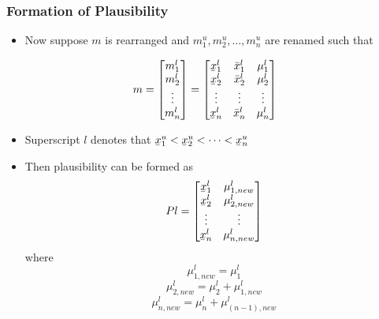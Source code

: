 \documentclass{beamer}
\newcommand{\ubar}[1]{\underaccent{\bar}{#1}}
\begin{document}
\begin{frame}[allowframebreaks]
\frametitle{Formation of Plausibility}
\begin{itemize}
\item{Now suppose $m$ is rearranged and $m_{1}^{u}, m_{2}^{u},\dots, m_{n}^{u}$ are renamed such that}
\end{itemize}
\begin{equation}
m = \begin{bmatrix*}
m_1^l \\
m_2^l \\
\vdots \\
m_n^l \end{bmatrix*}
= \begin{bmatrix*}
\ubar{x}_1^l & \bar{x}_1^l & \mu_1^l \\
\ubar{x}_2^l & \bar{x}_2^l & \mu_2^l \\
\vdots & \vdots & \vdots \\
\ubar{x}_n^l & \bar{x}_n^l & \mu_n^l \\ \end{bmatrix*}
\label{mu}
\end{equation}
\begin{itemize}
\item{Superscript $l$ denotes that $\ubar{x}_1^u < \ubar{x}_2^u < \dots < \ubar{x}_n^u$}
\framebreak
\item{Then plausibility can be formed as
\begin{equation}
Pl = \begin{bmatrix*}
\ubar{x}_1^l & \mu_{1,new}^l \\
\ubar{x}_2^l & \mu_{2,new}^l \\
\vdots & \vdots \\
\ubar{x}_n^l & \mu_{n,new}^l \end{bmatrix*}
\label{m}
\end{equation}
\noindent where
\begin{equation}
\mu_{1,new}^l = \mu_1^l
\label{mu1u}
\end{equation}
\begin{equation}
\mu_{2,new}^l = \mu_2^l+\mu_{1,new}^l
\label{mu2u}
\end{equation}
\begin{equation}
\mu_{n,new}^l = \mu_n^l+\mu_{(n-1),new}^l
\label{munu}
\end{equation}}
\end{itemize}
\end{frame}
\end{document}
